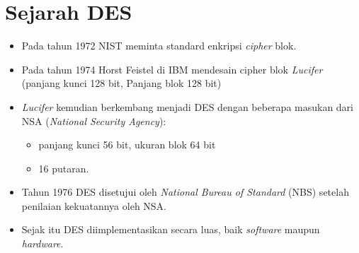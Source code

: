 \documentclass{article}
\begin{document}

\section*{Sejarah DES}

\begin{itemize}
    \item Pada tahun 1972 NIST meminta standard enkripsi \textit{cipher} blok.
    \item Pada tahun 1974 Horst Feistel di IBM mendesain cipher blok \textit{Lucifer} (panjang kunci 128 bit, Panjang blok 128 bit)
    \item \textit{Lucifer} kemudian berkembang menjadi DES dengan beberapa masukan dari NSA (\textit{National Security Agency}):
    \begin{itemize}
        \item panjang kunci 56 bit, ukuran blok 64 bit
        \item 16 putaran.
    \end{itemize}
    \item Tahun 1976 DES disetujui oleh \textit{National Bureau of Standard} (NBS) setelah penilaian kekuatannya oleh NSA.
    \item Sejak itu DES diimplementasikan secara luas, baik \textit{software} maupun \textit{hardware}.
\end{itemize}
\end{document}

